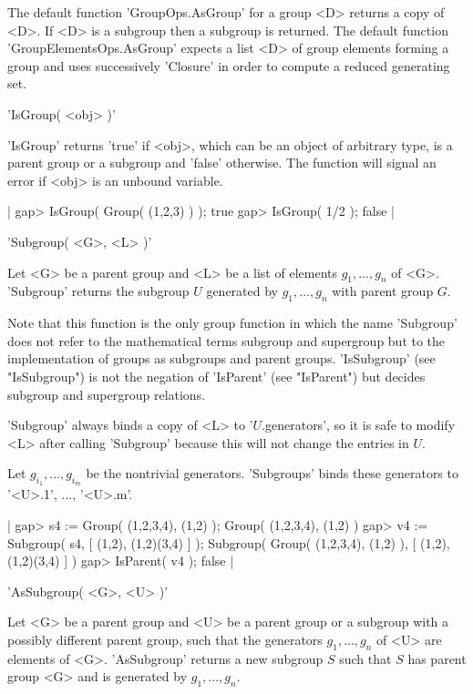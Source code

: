 The default function 'GroupOps.AsGroup' for a group <D> returns a copy of
<D>.  If <D>  is a  subgroup then  a   subgroup is  returned. The default
function 'GroupElementsOps.AsGroup' expects a list <D> of group  elements
forming a  group  and uses successively 'Closure'  in  order to compute a
reduced generating set.


'IsGroup( <obj> )'

'IsGroup' returns 'true' if  <obj>, which can be  an object of  arbitrary
type, is a parent group or a subgroup and 'false' otherwise. The function
will signal an error if <obj> is an unbound variable.

|    gap> IsGroup( Group( (1,2,3) ) );
    true
    gap> IsGroup( 1/2 );
    false |


'Subgroup( <G>, <L> )'

Let <G> be a parent group and <L> be a  list  of elements $g_1, ..., g_n$
of <G>.  'Subgroup' returns the subgroup $U$ generated by $g_1, ..., g_n$
with parent group $G$.

Note  that this function  is  the only  group  function in which the name
'Subgroup'  does not   refer  to  the  mathematical terms  subgroup   and
supergroup but  to the implementation  of  groups as subgroups and parent
groups.   'IsSubgroup'  (see   "IsSubgroup")  is  not   the   negation of
'IsParent'  (see   "IsParent")  but   decides   subgroup  and  supergroup
relations.

'Subgroup' always binds a copy of <L> to '$U$.generators',  so it is safe
to modify <L> after calling 'Subgroup' because  this will  not change the
entries in $U$.

Let $g_{i_1}, ..., g_{i_m}$ be  the nontrivial  generators.   'Subgroups'
binds these generators to '<U>.1', ..., '<U>.m'.

|    gap> s4 := Group( (1,2,3,4), (1,2) );
    Group( (1,2,3,4), (1,2) )
    gap> v4 := Subgroup( s4, [ (1,2), (1,2)(3,4) ] );
    Subgroup( Group( (1,2,3,4), (1,2) ), [ (1,2), (1,2)(3,4) ] )
    gap> IsParent( v4 );
    false |


'AsSubgroup( <G>, <U> )'

Let <G> be a parent group and <U> be a parent group or  a subgroup with a
possibly different parent group, such that the generators $g_1, ..., g_n$
of <U> are elements of <G>.  'AsSubgroup' returns a new subgroup $S$ such
that $S$ has parent group <G> and is generated by $g_1, ..., g_n$.

